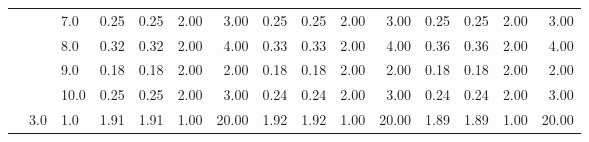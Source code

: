 \begin{tabular}{lllrrrrrrrrrrrr}
       &     & 7.0  &       0.25 &      0.25 & 2.00 &   3.00 &       0.25 &      0.25 & 2.00 &   3.00 &       0.25 &      0.25 & 2.00 &   3.00 \\
       &     & 8.0  &       0.32 &      0.32 & 2.00 &   4.00 &       0.33 &      0.33 & 2.00 &   4.00 &       0.36 &      0.36 & 2.00 &   4.00 \\
       &     & 9.0  &       0.18 &      0.18 & 2.00 &   2.00 &       0.18 &      0.18 & 2.00 &   2.00 &       0.18 &      0.18 & 2.00 &   2.00 \\
       &     & 10.0 &       0.25 &      0.25 & 2.00 &   3.00 &       0.24 &      0.24 & 2.00 &   3.00 &       0.24 &      0.24 & 2.00 &   3.00 \\
       & 3.0 & 1.0  &       1.91 &      1.91 & 1.00 &  20.00 &       1.92 &      1.92 & 1.00 &  20.00 &       1.89 &      1.89 & 1.00 &  20.00 \\
\bottomrule
\end{tabular}
